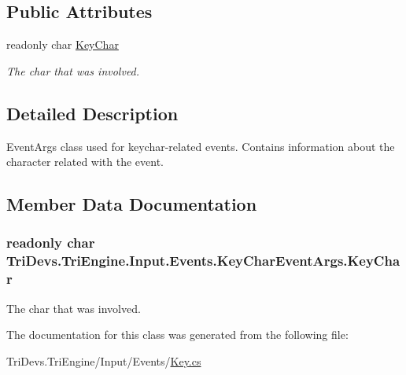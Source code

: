\subsection*{Public Attributes}
\begin{DoxyCompactItemize}
\item 
readonly char \hyperlink{class_tri_devs_1_1_tri_engine_1_1_input_1_1_events_1_1_key_char_event_args_a099f52bb4062e74a5e412d06309dfb86}{Key\-Char}
\begin{DoxyCompactList}\small\item\em The char that was involved. \end{DoxyCompactList}\end{DoxyCompactItemize}


\subsection{Detailed Description}
Event\-Args class used for keychar-\/related events. Contains information about the character related with the event. 



\subsection{Member Data Documentation}
\hypertarget{class_tri_devs_1_1_tri_engine_1_1_input_1_1_events_1_1_key_char_event_args_a099f52bb4062e74a5e412d06309dfb86}{
\subsubsection[{Key\-Char}]{\setlength{\rightskip}{0pt plus 5cm}readonly char Tri\-Devs.\-Tri\-Engine.\-Input.\-Events.\-Key\-Char\-Event\-Args.\-Key\-Char}}\label{class_tri_devs_1_1_tri_engine_1_1_input_1_1_events_1_1_key_char_event_args_a099f52bb4062e74a5e412d06309dfb86}


The char that was involved. 



The documentation for this class was generated from the following file\-:\begin{DoxyCompactItemize}
\item 
Tri\-Devs.\-Tri\-Engine/\-Input/\-Events/\hyperlink{_key_8cs}{Key.\-cs}\end{DoxyCompactItemize}
